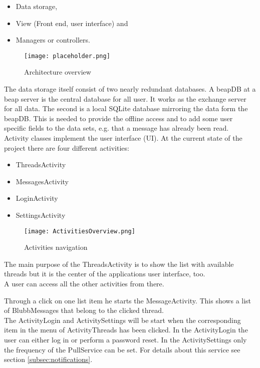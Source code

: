 \documentclass[12pt,a4paper,oneside]{report}
\newcommand{\beapDB}{beapDB}
\newcommand{\beapServer}{beap server}
\begin{document}
\begin{itemize}
\item{Data storage,}
\item{View (Front end, user interface) and}
\item{Managers or controllers.}
\end{itemize}

\begin{figure}[!ht]
    \texttt{[image: placeholder.png]}
	\caption{Architecture overview} 
	\label{fig:ArchOV}
\end{figure}

The data storage itself consist of two nearly redundant databases. A \beapDB{} at a \beapServer{} is the central database for all user. It works as the exchange server for all data. The second is a local SQLite database mirroring the data form the \beapDB{}. This is needed to provide the offline access and to add some user specific fields to the data sets, e.g. that a message has already been read.\\
Activity classes implement the user interface (UI). At the current state of the project there are four different activities:

\begin{itemize}
\item{ThreadsActivity}
\item{MessagesActivity}
\item{LoginActivity}
\item{SettingsActivity}
\end{itemize}

\begin{figure}[!ht]
	\centering
    \texttt{[image: ActivitiesOverview.png]}
	\caption{Activities navigation}
	\label{fig:ActivitiesNav}
\end{figure}

The main purpose of the ThreadsActivity is to show the list with available threads but it is the center of the applications user interface, too.\\ 
A user can access all the other activities from there. 


Through a click on one list item he starts the MessageActivity. This shows a list of BlubbMessages that belong to the clicked thread. \\
The ActivityLogin and ActivitySettings will be start when the corresponding item in the menu of ActivityThreads has been clicked. In the ActivityLogin the user can either log in or perform a password reset.
In the ActivitySettings only the frequency of the PullService can be set. For details about this service see section \ref{subsec:notifications}.
\end{document}
